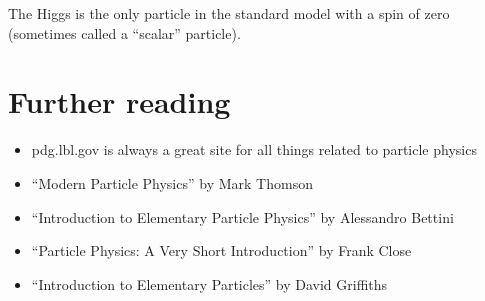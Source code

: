 The Higgs is the only particle in the standard model with a spin of zero (sometimes called a ``scalar'' particle).

\section{Further reading}
\begin{itemize}
\item pdg.lbl.gov is always a great site for all things related to particle physics
\item ``Modern Particle Physics'' by Mark Thomson
\item ``Introduction to Elementary Particle Physics'' by Alessandro Bettini
\item ``Particle Physics: A Very Short Introduction'' by Frank Close
\item ``Introduction to Elementary Particles'' by David Griffiths
\end{itemize}


